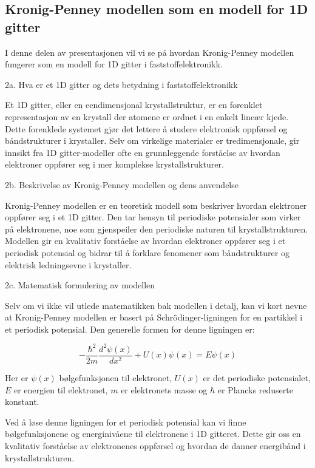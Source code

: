\homeworkProblem[5]

\subsection*{Kronig-Penney modellen som en modell for 1D gitter}

I denne delen av presentasjonen vil vi se på hvordan Kronig-Penney modellen fungerer som en modell for 1D gitter i faststoffelektronikk.

2a. Hva er et 1D gitter og dets betydning i faststoffelektronikk

Et 1D gitter, eller en eendimensjonal krystallstruktur, er en forenklet representasjon av en krystall der atomene er ordnet i en enkelt lineær kjede. Dette forenklede systemet gjør det lettere å studere elektronisk oppførsel og båndstrukturer i krystaller. Selv om virkelige materialer er tredimensjonale, gir innsikt fra 1D gitter-modeller ofte en grunnleggende forståelse av hvordan elektroner oppfører seg i mer komplekse krystallstrukturer.

2b. Beskrivelse av Kronig-Penney modellen og dens anvendelse

Kronig-Penney modellen er en teoretisk modell som beskriver hvordan elektroner oppfører seg i et 1D gitter. Den tar hensyn til periodiske potensialer som virker på elektronene, noe som gjenspeiler den periodiske naturen til krystallstrukturen. Modellen gir en kvalitativ forståelse av hvordan elektroner oppfører seg i et periodisk potensial og bidrar til å forklare fenomener som båndstrukturer og elektrisk ledningsevne i krystaller.

2c. Matematisk formulering av modellen

Selv om vi ikke vil utlede matematikken bak modellen i detalj, kan vi kort nevne at Kronig-Penney modellen er basert på Schrödinger-ligningen for en partikkel i et periodisk potensial. Den generelle formen for denne ligningen er:

\begin{equation*}
-\frac{\hbar^2}{2m}\frac{d^2\psi(x)}{dx^2} + U(x) \psi(x) = E \psi(x)
\end{equation*}

Her er $\psi(x)$ bølgefunksjonen til elektronet, $U(x)$ er det periodiske potensialet, $E$ er energien til elektronet, $m$ er elektronets masse og $\hbar$ er Plancks reduserte konstant.

Ved å løse denne ligningen for et periodisk potensial kan vi finne bølgefunksjonene og energinivåene til elektronene i 1D gitteret. Dette gir oss en kvalitativ forståelse av elektronenes oppførsel og hvordan de danner energibånd i krystallstrukturen.

